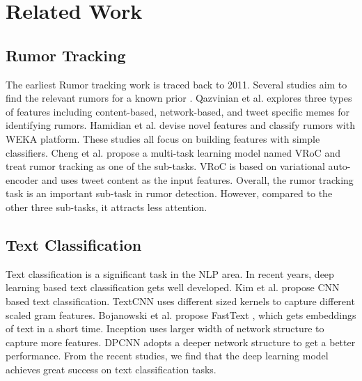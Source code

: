 \section{Related Work}
\label{sec:related}

\subsection{Rumor Tracking}
\label{sec:rumortracking}
The earliest Rumor tracking work is traced back to 2011. Several studies aim to find the relevant rumors for a known prior \cite{DBLP:journals/csur/ZubiagaABLP18}. Qazvinian et al. \cite{DBLP:conf/emnlp/QazvinianRRM11} explores three types of features including content-based, network-based, and tweet specific memes for identifying rumors. Hamidian et al. \cite{DBLP:journals/corr/abs-1912-08926} devise novel features and classify rumors with WEKA platform. These studies all focus on building features with simple classifiers. Cheng et al. \cite{DBLP:conf/www/ChengNB20} propose a multi-task learning model named VRoC and treat rumor tracking as one of the sub-tasks. VRoC is based on variational auto-encoder and uses tweet content as the input features. Overall, the rumor tracking task is an important sub-task in rumor detection. However, compared to the other three sub-tasks, it attracts less attention.

\subsection{Text Classification}
\label{sec:textclassification}
Text classification is a significant task in the NLP area. In recent years, deep learning based text classification gets well developed. Kim et al. \cite{DBLP:conf/emnlp/Kim14} propose CNN based text classification. TextCNN uses different sized kernels to capture different scaled gram features. Bojanowski et al. propose FastText  \cite{DBLP:journals/tacl/BojanowskiGJM17}, which gets embeddings of text in a short time. Inception \cite{DBLP:journals/corr/SzegedyLJSRAEVR14} uses larger width of network structure to capture more features. DPCNN \cite{DBLP:conf/acl/JohnsonZ17} adopts a deeper network structure to get a better performance. From the recent studies, we find that the deep learning model achieves great success on text classification tasks.
